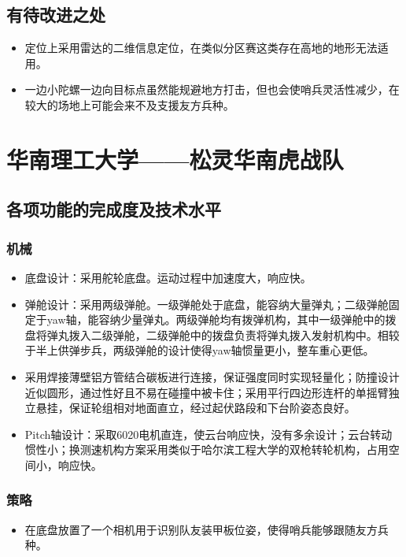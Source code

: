 \subsection{有待改进之处}
\begin{itemize}
    \item 定位上采用雷达的二维信息定位，在类似分区赛这类存在高地的地形无法适用。
    \item 一边小陀螺一边向目标点虽然能规避地方打击，但也会使哨兵灵活性减少，在较大的场地上可能会来不及支援友方兵种。
\end{itemize}


\section{华南理工大学——松灵华南虎战队}
\subsection{各项功能的完成度及技术水平}

\subsubsection{机械}
\begin{itemize}
      \item 底盘设计：采用舵轮底盘。运动过程中加速度大，响应快。
      \item 弹舱设计：采用两级弹舱。一级弹舱处于底盘，能容纳大量弹丸；二级弹舱固定于yaw轴，能容纳少量弹丸。两级弹舱均有拨弹机构，其中一级弹舱中的拨盘将弹丸拨入二级弹舱，二级弹舱中的拨盘负责将弹丸拨入发射机构中。相较于半上供弹步兵，两级弹舱的设计使得yaw轴惯量更小，整车重心更低。
      \item 采用焊接薄壁铝方管结合碳板进行连接，保证强度同时实现轻量化；防撞设计近似圆形，通过性好且不易在碰撞中被卡住；采用平行四边形连杆的单摇臂独立悬挂，保证轮组相对地面直立，经过起伏路段和下台阶姿态良好。
      \item Pitch轴设计：采取6020电机直连，使云台响应快，没有多余设计；云台转动惯性小；换测速机构方案采用类似于哈尔滨工程大学的双枪转轮机构，占用空间小，响应快。
\end{itemize}

\subsubsection{策略}
\begin{itemize}
      \item 在底盘放置了一个相机用于识别队友装甲板位姿，使得哨兵能够跟随友方兵种。
\end{itemize}

